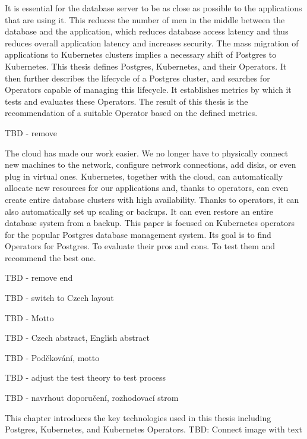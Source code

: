 
It is essential for the database server to be as close as possible to the applications that are using it. This reduces the number of men in the middle between the database and the application, which reduces database access latency and thus reduces overall application latency and increases security. The mass migration of applications to Kubernetes clusters implies a necessary shift of Postgres to Kubernetes. This thesis defines Postgres, Kubernetes, and their Operators. It then further describes the lifecycle of a Postgres cluster, and searches for Operators capable of managing this lifecycle. It establishes metrics by which it tests and evaluates these Operators.  The result of this thesis is the recommendation of a suitable Operator based on the defined metrics.

TBD - remove

The cloud has made our work easier. We no longer have to physically connect new machines to the network, configure network connections, add disks, or even plug in virtual ones. Kubernetes, together with the cloud, can automatically allocate new resources for our applications and, thanks to operators, can even create entire database clusters with high availability. Thanks to operators, it can also automatically set up scaling or backups. It can even restore an entire database system from a backup. This paper is focused on Kubernetes operators for the popular Postgres database management system. Its goal is to find Operators for Postgres. To evaluate their pros and cons. To test them and recommend the best one.

TBD - remove end

TBD - switch to Czech layout

TBD - Motto

TBD - Czech abstract, English abstract

TBD - Poděkování, motto

TBD - adjust the test theory to test process

TBD - navrhout doporučení, rozhodovací strom

\sloppy
{}
This chapter introduces the key technologies used in this thesis including Postgres, Kubernetes, and Kubernetes Operators.
TBD: Connect image with text

